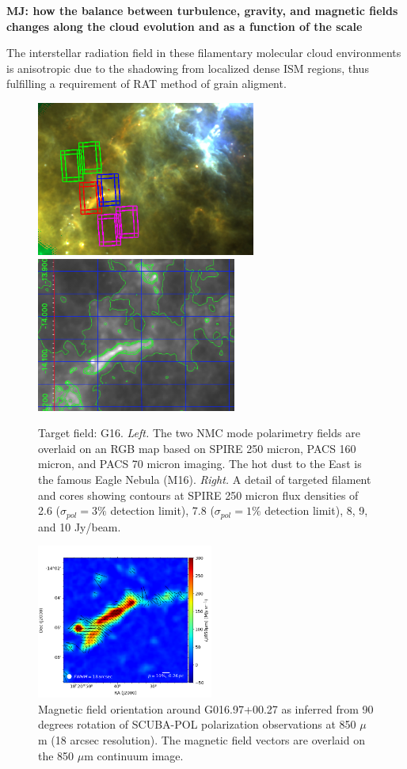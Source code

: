 \documentclass[11pt]{amsart}
\begin{document}
{{\bf MJ: how the balance between turbulence, gravity, and magnetic fields changes along the cloud evolution and as a function of the scale}

The interstellar radiation field in these filamentary molecular cloud environments is anisotropic due to the shadowing from localized dense ISM regions, thus fulfilling a requirement of  RAT method of grain aligment.

\begin{figure}
\includegraphics[height=2in]{g16_nmc.png}
\includegraphics[height=2in]{g16_c3a.png}
\caption{Target field: G16. {\it Left.}  The two NMC mode polarimetry fields are overlaid on an RGB map based on SPIRE 250 micron, PACS 160 micron, and PACS 70 micron imaging.  The hot dust to the East is the famous Eagle Nebula (M16).  {\it Right.} A detail of targeted filament and cores showing contours at SPIRE 250 micron flux densities of 2.6 ($\sigma_{pol} = 3\%$ detection limit), 7.8 ($\sigma_{pol} = 1\%$ detection limit), 8, 9, and 10 Jy/beam. 
\label{fig:fields}}
\end{figure}


\begin{figure}
\includegraphics[height=2in]{G16p96_SCUBAPOL_FWHM18.png}
\caption{Magnetic field orientation around G016.97+00.27 as inferred from 90 degrees rotation of SCUBA-POL polarization observations at 850 $\mu$m (18 arcsec resolution). The magnetic field vectors are overlaid on the 850 $\mu$m continuum
image.
\label{fig:scubapol}}
\end{figure}


}
\end{document}
